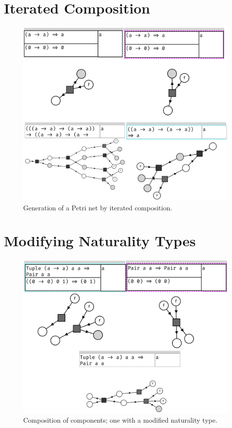 \documentclass[11pt,openright,hidelinks,a4paper]{article}
\begin{document}
\section{Iterated Composition}\label{app:itcomp}
\begin{figure}[H]
\begin{center}
\includegraphics[scale=0.45]{compose2}
\end{center}
\caption{Generation of a Petri net by iterated composition.}
\label{fig:compose2}
\end{figure}

\section{Modifying Naturality Types}\label{app:modcomp}

\begin{figure}[H]
\begin{center}
\includegraphics[scale=0.45]{natcompose2}
\end{center}
\caption{Composition of components; one with a modified naturality type.}
\label{fig:natcompose}
\end{figure}
\end{document}
